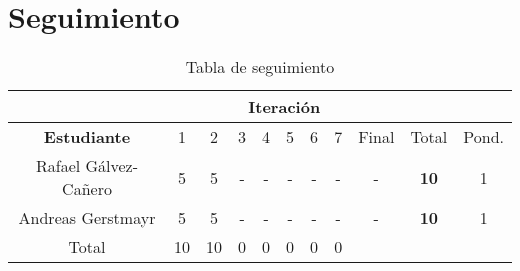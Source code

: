 \section{Seguimiento}

\begin{table}[htdp]
\begin{center}
\begin{tabular}{|c|c|c|c|c|c|c|c|c|c|c|}
\cline{2-9}
\multicolumn{1}{c}{}&\multicolumn{8}{|c|}{\textbf{Iteración}}&\multicolumn{2}{c}{}\\
\hline
\textbf{Estudiante}&1&2&3&4&5&6&7&Final&Total&Pond.\\
\hline
Rafael Gálvez-Cañero&5&5&-&-&-&-&-&-&\textbf{10}&1\\
Andreas Gerstmayr   &5&5&-&-&-&-&-&-&\textbf{10}&1\\
\hline
Total               &10&10&0&0&0&0&0&\multicolumn{2}{c}{}\\
\cline{1-8}
\end{tabular}
\end{center}
\caption{Tabla de seguimiento}
\label{tab:seguimiento}
\end{table}%
